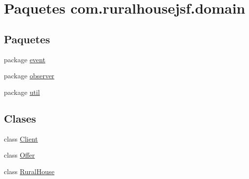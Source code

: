 \hypertarget{namespacecom_1_1ruralhousejsf_1_1domain}{}\section{Paquetes com.\+ruralhousejsf.\+domain}
\label{namespacecom_1_1ruralhousejsf_1_1domain}
\subsection*{Paquetes}
\begin{DoxyCompactItemize}
\item 
package \mbox{\hyperlink{namespacecom_1_1ruralhousejsf_1_1domain_1_1event}{event}}
\item 
package \mbox{\hyperlink{namespacecom_1_1ruralhousejsf_1_1domain_1_1observer}{observer}}
\item 
package \mbox{\hyperlink{namespacecom_1_1ruralhousejsf_1_1domain_1_1util}{util}}
\end{DoxyCompactItemize}
\subsection*{Clases}
\begin{DoxyCompactItemize}
\item 
class \mbox{\hyperlink{classcom_1_1ruralhousejsf_1_1domain_1_1_client}{Client}}
\item 
class \mbox{\hyperlink{classcom_1_1ruralhousejsf_1_1domain_1_1_offer}{Offer}}
\item 
class \mbox{\hyperlink{classcom_1_1ruralhousejsf_1_1domain_1_1_rural_house}{Rural\+House}}
\end{DoxyCompactItemize}
